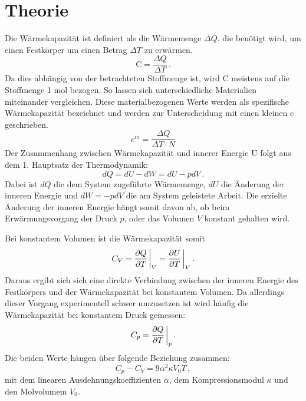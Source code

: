 \section{Theorie}
\label{sec:Theorie}

Die Wärmekapazität ist definiert als die Wärmemenge $\Delta Q$, die benötigt wird, um einen Festkörper um einen Betrag $\Delta T$ zu erwärmen.
\begin{equation}
	\text{C} =  \frac{\Delta Q}{\Delta T} \,.
	\label{eq:C-Def}
\end{equation}
Da dies abhängig von der betrachteten Stoffmenge ist, wird C meistens auf die Stoffmenge 1 mol bezogen. So lassen sich unterschiedliche Materialien miteinander vergleichen. Diese materialbezogenen Werte werden als spezifische Wärmekapazität bezeichnet und werden zur Unterscheidung mit einen kleinen c geschrieben.
\begin{equation}	
	c^m = \frac{\Delta Q}{\Delta T \cdot N}
	\label{eq:c_mol}
\end{equation}
Der Zusammenhang zwischen Wärmekapazität und innerer Energie U folgt aus dem 1. Hauptsatz der Thermodynamik:
\begin{equation}
	dQ = dU - dW = dU - pdV \,.
	\label{eq:1.Haupt}
\end{equation}
Dabei ist $dQ$ die dem System zugeführte Wärmemenge, $dU$ die Änderung der inneren Energie und $dW = - pdV$ die am System geleistete Arbeit.
Die erzielte Änderung der inneren Energie hängt somit davon ab, ob beim Erwärmungsvorgang der Druck $p$, oder das Volumen $V$ konstant gehalten wird.

Bei konstantem Volumen ist die Wärmekapazität somit
\begin{equation}
	C_V = \pdv{Q}{T}\eval_V = \pdv{U}{T}\eval_V \,.
	\label{eq:cv_algemein}
\end{equation}
Daraus ergibt sich sich eine direkte Verbindung zwischen der inneren Energie des Festkörpers und der Wärmekapazität bei konstantem Volumen. Da allerdings dieser Vorgang experimentell schwer umzusetzen ist wird häufig die Wärmekapazität bei konstantem Druck gemessen:
\begin{equation}
	C_p = \pdv{Q}{T}\eval_p \,.
	\label{eq:cp_algemein}
\end{equation}
Die beiden Werte hängen über folgende Beziehung zusammen:
\begin{equation}
	C_p - C_V = 9 \alpha^2 \kappa V_0 T \,,
\end{equation}
mit dem linearen Ausdehnungskoeffizienten $\alpha$, dem Kompressionsmodul $\kappa$ und den Molvolumem $V_0$.

